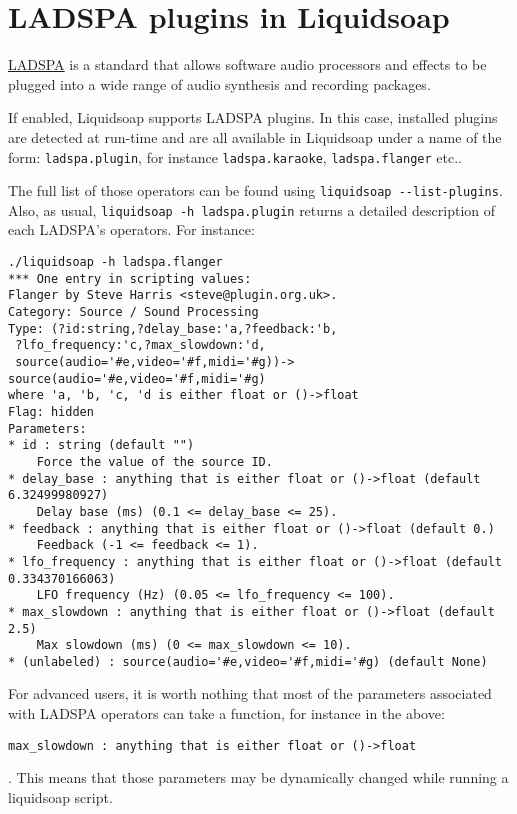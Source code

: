 \section{LADSPA plugins in Liquidsoap}
\href{http://www.ladspa.org/}{LADSPA} is a standard that allows software audio processors and effects to be plugged into a 
wide range of audio synthesis and recording packages.

If enabled, Liquidsoap supports LADSPA plugins. In this case,
installed plugins are detected at run-time and are all available in Liquidsoap under a name 
of the form: \verb+ladspa.plugin+, for instance \verb+ladspa.karaoke+, \verb+ladspa.flanger+ etc..

The full list of those operators can be found using \verb+liquidsoap --list-plugins+.
Also, as usual, \verb+liquidsoap -h ladspa.plugin+ returns a detailed description of each LADSPA's operators.
For instance:

\begin{verbatim}
./liquidsoap -h ladspa.flanger           
*** One entry in scripting values:
Flanger by Steve Harris <steve@plugin.org.uk>.
Category: Source / Sound Processing
Type: (?id:string,?delay_base:'a,?feedback:'b,
 ?lfo_frequency:'c,?max_slowdown:'d,
 source(audio='#e,video='#f,midi='#g))->
source(audio='#e,video='#f,midi='#g)
where 'a, 'b, 'c, 'd is either float or ()->float
Flag: hidden
Parameters:
* id : string (default "")
    Force the value of the source ID.
* delay_base : anything that is either float or ()->float (default 6.32499980927)
    Delay base (ms) (0.1 <= delay_base <= 25).
* feedback : anything that is either float or ()->float (default 0.)
    Feedback (-1 <= feedback <= 1).
* lfo_frequency : anything that is either float or ()->float (default 0.334370166063)
    LFO frequency (Hz) (0.05 <= lfo_frequency <= 100).
* max_slowdown : anything that is either float or ()->float (default 2.5)
    Max slowdown (ms) (0 <= max_slowdown <= 10).
* (unlabeled) : source(audio='#e,video='#f,midi='#g) (default None)
\end{verbatim}
For advanced users, it is worth nothing that most of the parameters associated with LADSPA operators
can take a function, for instance in the above: \begin{verbatim}
max_slowdown : anything that is either float or ()->float
\end{verbatim}
.
This means that those parameters may be dynamically changed while running a liquidsoap script.

